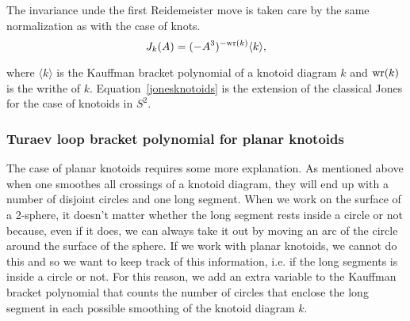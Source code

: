 The invariance unde the first Reidemeister move is taken care by the same normalization as with the case of knots.
\begin{equation}\label{jonesknotoids}
J_k(A) = (-A^3)^{- {\rm wr}(k)} \langle k \rangle,
\end{equation}

where $\langle k \rangle$ is the Kauffman bracket polynomial of a knotoid diagram $k$ and ${\rm wr}(k)$ is the writhe of $k$. Equation~\ref{jonesknotoids} is the extension of the classical Jones for the case of knotoids in $S^2$.
\subsubsection{\label{sec:theory:jones:jonesknotoids}Turaev loop bracket polynomial for planar knotoids}
The case of planar knotoids requires some more explanation. As mentioned above when one smoothes all crossings of a knotoid diagram, they will end up with a number of disjoint circles and one long segment. When we work on the surface of a 2-sphere, it doesn't matter whether the long segment rests inside a circle or not because, even if it does, we can always take it out by moving an arc of the circle around the surface of the sphere. If we work with planar knotoids, we cannot do this and so we want to keep track of this information, i.e. if the long segments is inside a circle or not. For this reason, we add an extra variable to the Kauffman bracket polynomial that counts the number of circles that enclose the long segment in each possible smoothing of the knotoid diagram $k$.


